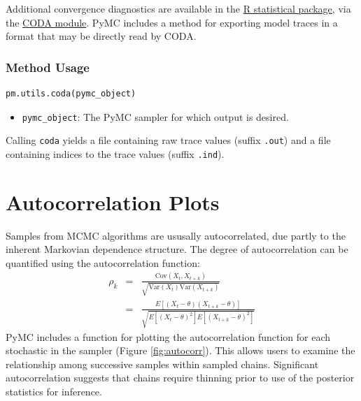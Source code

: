 Additional convergence diagnostics are available in the
\href{http://lib.stat.cmu.edu/R/CRAN/}{R statistical package}, via the
\href{http://www-fis.iarc.fr/coda/}{CODA module}. PyMC includes a method
 for exporting model traces in a format that may be
directly read by CODA.

\subsubsection*{Method Usage}
\begin{verbatim}
pm.utils.coda(pymc_object)
\end{verbatim}
\begin{itemize}

\item \verb=pymc_object=: The PyMC sampler for which output is desired.

\end{itemize}
Calling \verb=coda= yields a file containing raw trace values (suffix
\verb=.out=) and a file containing indices to the trace values (suffix
\verb=.ind=).


\hypertarget{autocorrelation}{}
\section{Autocorrelation Plots} %

Samples from MCMC algorithms are ususally autocorrelated, due partly to the
inherent Markovian dependence structure. The degree of autocorrelation can
be quantified using the autocorrelation function:
\begin{eqnarray*}
    \rho_k &=& \frac{\mbox{Cov}(X_t,
X_{t+k})}{\sqrt{\mbox{Var}(X_t)\mbox{Var}(X_{t+k})}} \\
            &=& \frac{E[(X_t - \theta)(X_{t+k} - \theta)]}{\sqrt{E[(X_t -
\theta)^2] E[(X_{t+k} - \theta)^2]}}
\end{eqnarray*}
PyMC includes a function for plotting the autocorrelation function for each
stochastic in the sampler (Figure \ref{fig:autocorr}). This allows users
to examine the relationship among successive samples within sampled chains.
Significant autocorrelation suggests that chains require thinning prior to
use of the posterior statistics for inference.

